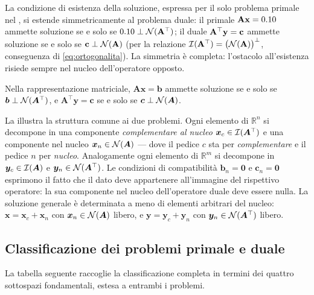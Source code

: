 La condizione di esistenza della soluzione, espressa per il solo
problema primale nel , si estende
simmetricamente al problema duale: il primale $\mathbf{A}\mathbf{x}=0.10$
ammette soluzione se e solo se $0.10\perp\mathcal{N}(\mathbf{A}^\top)$; il
duale $\mathbf{A}^\top\mathbf{y}=\mathbf{c}$ ammette soluzione se e solo se
$\mathbf{c}\perp\mathcal{N}(\mathbf{A})$ (per la relazione $\mathcal{I}(\mathbf{A}^\top)=\bigl(\mathcal{N}(\mathbf{A})\bigr)^\perp$, conseguenza di \eqref{eq:ortogonalita}). La simmetria è completa: l'ostacolo
all'esistenza risiede sempre nel nucleo dell'operatore opposto.

Nella rappresentazione matriciale, $\bm{A}\bm{x}=\bm{b}$ ammette soluzione se e solo se $\bm{b}\perp\mathcal{N}(\bm{A}^\top)$, e $\bm{A}^\top\bm{y}=\bm{c}$ se e solo se $\bm{c}\perp\mathcal{N}(\bm{A})$.

\begin{oss}
	La  illustra la struttura comune ai due
	problemi. Ogni elemento di $\mathbb{R}^n$ si decompone in una
	componente \emph{complementare al nucleo} $\bm{x}_c \in \mathcal{I}(\bm{A}^\top)$
	e una componente nel nucleo $\bm{x}_n \in \mathcal{N}(\bm{A})$ --- dove il
	pedice $c$ sta per \emph{complementare} e il pedice $n$ per
	\emph{nucleo}. Analogamente ogni elemento di $\mathbb{R}^m$ si
	decompone in $\bm{y}_c \in \mathcal{I}(\bm{A})$ e $\bm{y}_n \in
	\mathcal{N}(\bm{A}^\top)$. Le condizioni di compatibilità $\bm{b}_n = \bm{0}$
	e $\bm{c}_n = \bm{0}$ esprimono il fatto che il dato deve appartenere
	all'immagine del rispettivo operatore: la sua componente nel nucleo
	dell'operatore duale deve essere nulla. La soluzione generale è
	determinata a meno di elementi arbitrari del nucleo:
	$\bm{x} = \bm{x}_c + \bm{x}_n$ con $\bm{x}_n \in \mathcal{N}(\bm{A})$
	libero, e $\bm{y} = \bm{y}_c + \bm{y}_n$ con
	$\bm{y}_n \in \mathcal{N}(\bm{A}^\top)$ libero.
\end{oss}




\subsection{Classificazione dei problemi primale e duale}
\label{sec:classificazione_primale_duale}

La tabella seguente raccoglie la classificazione completa in termini
dei quattro sottospazi fondamentali, estesa a entrambi i problemi.


